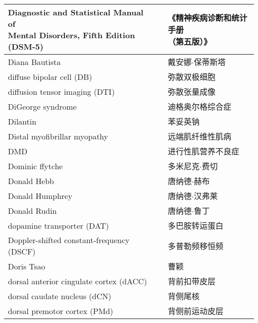 \begin{longtable}{lll}
	\midrule
	\makecell[l]{Diagnostic and Statistical Manual of \\Mental Disorders, Fifth Edition (DSM-5)}     &&  \makecell[l]{《精神疾病诊断和统计手册\\（第五版）》}  \\
	
	\midrule
	Diana Bautista    &&  戴安娜$\cdot$保蒂斯塔  \\
	
	\midrule
	diffuse bipolar cell (DB)    &&  弥散双极细胞  \\
	
	\midrule
	diffusion tensor imaging (DTI)    &&  弥散张量成像  \\
	
	\midrule
	DiGeorge syndrome    &&  迪格奥尔格综合症  \\
	
	\midrule
	Dilantin    &&  苯妥英钠  \\
	
	\midrule
	Distal myofibrillar myopathy    &&  远端肌纤维性肌病  \\
	
	\midrule
	DMD    &&  进行性肌营养不良症  \\
	
	\midrule
	Dominic ffytche    &&  多米尼克$\cdot$费切  \\
	
	\midrule
	Donald Hebb    &&  唐纳德$\cdot$赫布  \\
	
	\midrule
	Donald Humphrey    &&  唐纳德$\cdot$汉弗莱  \\
	
	\midrule
	Donald Rudin    &&  唐纳德$\cdot$鲁丁  \\
	
	\midrule
	dopamine transporter (DAT)     &&  多巴胺转运蛋白  \\
	
	\midrule
	Doppler-shifted constant-frequency (DSCF)     &&  多普勒频移恒频  \\
	
	\midrule
	Doris Tsao     &&  曹颖  \\
	
	\midrule
	dorsal anterior cingulate cortex (dACC)     &&  背前扣带皮层  \\
	
	\midrule
	dorsal caudate nucleus (dCN)     &&  背侧尾核  \\
	
	\midrule
	dorsal premotor cortex (PMd)     &&  背侧前运动皮层  \\
	

\end{longtable}
